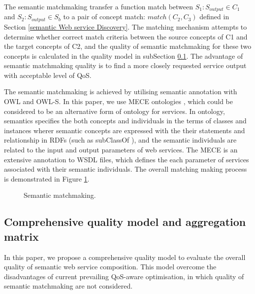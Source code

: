 \documentclass{llncs}
\begin{document}
The semantic matchmaking transfer a function match between $S_{1}: S_{output} \in C_{1}$ and $S_{2}:S_{output} \in S_{b}$ to a pair of concept match: $match(C_{2}, C_{3})$ defined in Section \ref{semantic Web service Discovery}. The matching mechanism attempts to determine whether correct match criteria between the source concepts of C1 and the target concepts of C2, and the quality of semantic matchmaking for these two concepts is calculated in the quality model in subSection \ref{qualityModel}. The advantage of semantic matchmaking quality is to find a more closely requested service output with acceptable level of QoS.

The semantic matchmaking is achieved by utilising semantic annotation with OWL and OWL-S. In this paper, we use MECE ontologies \cite{bleul2008self}, which could be considered to be an alternative form of ontology for services. In ontology, semantics specifies the both concepts and individuals in the terms of classes and instances wherer semantic concepts are expressed with the their statements and relationship in RDFs (such as subClassOf ), and the semantic individuals are related to the input and output parameters of web services. The MECE is an extensive annotation to WSDL files, which defines the each parameter of services associated with their semantic individuals. The overall matching making process is demonstrated in Figure \ref{matchmaking}.

\begin{figure}[h]
\centerline{
}
 \caption{Semantic matchmaking.}
 \label{matchmaking}
\end{figure}

\subsection{Comprehensive quality model and aggregation matrix}\label{qualityModel}
In this paper, we propose a comprehensive quality model to evaluate the overall quality of semantic web service composition. This model overcome the disadvantages of current prevailing QoS-aware optimisation, in which quality of semantic matchmaking are not considered.
\end{document}
